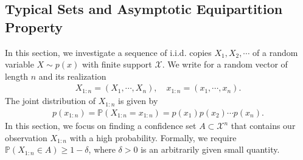 \documentclass{article}
\numberwithin{equation}{section}
\newcommand{\bbP}{\mathbb{P}}
\theoremstyle{plain}
\theoremstyle{definition}
\begin{document}
\subsection{Typical Sets and Asymptotic Equipartition Property}
In this section, we investigate a sequence of i.i.d. copies $X_1,X_2,\cdots$ of a random variable $X\sim p(x)$ with finite support $\mathcal{X}$. We write for a random vector of length $n$ and its realization
\begin{align*}
	X_{1:n}=(X_1,\cdots,X_n),\quad x_{1:n}=(x_1,\cdots,x_n).
\end{align*}
The joint distribution of $X_{1:n}$ is given by
\begin{align*}
	p(x_{1:n}) = \bbP\left(X_{1:n}=x_{1:n}\right)=p(x_1)p(x_2)\cdots p(x_n).
\end{align*}
In this section, we focus on finding a confidence set $A\subset\mathcal{X}^n$ that contains our observation $X_{1:n}$ with a high probability. Formally, we require $\bbP(X_{1:n}\in A)\geq 1-\delta$,
where $\delta>0$ is an arbitrarily given small quantity.
\end{document}
